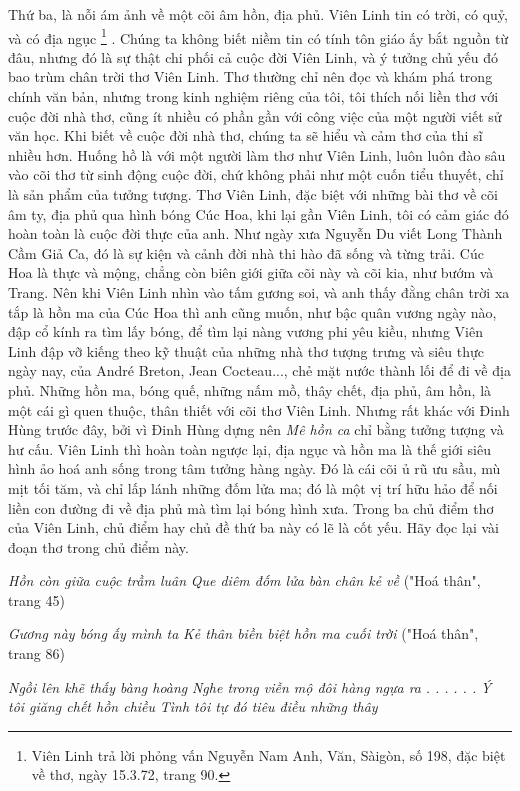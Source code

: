 \documentclass[../main.tex]{subfiles}
\begin{document}
\begin{multicols}{2}
Thứ ba, là nỗi ám ảnh về một cõi âm hồn, địa phủ. Viên Linh tin có trời, có quỷ, và có địa ngục \footnote{
Viên Linh trả lời phỏng vấn Nguyễn Nam Anh, Văn, Sàigòn, số 198, đặc biệt về thơ, ngày 15.3.72, trang 90.} . Chúng ta không biết niềm tin có tính tôn giáo ấy bắt nguồn từ đâu, nhưng đó là sự thật chi phối cả cuộc đời Viên Linh, và ý tưởng chủ yếu đó bao trùm chân trời thơ Viên Linh. Thơ thường chỉ nên đọc và khám phá trong chính văn bản, nhưng trong kinh nghiệm riêng của tôi, tôi thích nối liền thơ với cuộc đời nhà thơ, cũng ít nhiều có phần gần với công việc của một người viết sử văn học. Khi biết về cuộc đời nhà thơ, chúng ta sẽ hiểu và cảm thơ của thi sĩ nhiều hơn. Huống hồ là với một người làm thơ như Viên Linh, luôn luôn đào sâu vào cõi thơ từ sinh động cuộc đời, chứ không phải như một cuốn tiểu thuyết, chỉ là sản phẩm của tưởng tượng. Thơ Viên Linh, đặc biệt với những bài thơ về cõi âm ty, địa phủ qua hình bóng Cúc Hoa, khi lại gần Viên Linh, tôi có cảm giác đó hoàn toàn là cuộc đời thực của anh. Như ngày xưa Nguyễn Du viết Long Thành Cầm Giả Ca, đó là sự kiện và cảnh đời nhà thi hào đã sống và từng trải. Cúc Hoa là thực và mộng, chẳng còn biên giới giữa cõi này và cõi kia, như bướm và Trang. Nên khi Viên Linh nhìn vào tấm gương soi, và anh thấy đằng chân trời xa tắp là hồn ma của Cúc Hoa thì anh cũng muốn, như bậc quân vương ngày nào, đập cổ kính ra tìm lấy bóng, để tìm lại nàng vương phi yêu kiều, nhưng Viên Linh đập vỡ kiếng theo kỹ thuật của những nhà thơ tượng trưng và siêu thực ngày nay, của André Breton, Jean Cocteau..., chẻ mặt nước thành lối để đi về địa phủ. Những hồn ma, bóng quế, những nấm mồ, thây chết, địa phủ, âm hồn, là một cái gì quen thuộc, thân thiết với cõi thơ Viên Linh. Nhưng rất khác với Đinh Hùng trước đây, bởi vì Đinh Hùng dựng nên \textit{Mê hồn ca} chỉ bằng tưởng tượng và hư cấu. Viên Linh thì hoàn toàn ngược lại, địa ngục và hồn ma là thế giới siêu hình ảo hoá anh sống trong tâm tưởng hàng ngày. Đó là cái cõi ủ rũ ưu sầu, mù mịt tối tăm, và chỉ lấp lánh những đốm lửa ma; đó là một vị trí hữu hảo để nối liền con đường đi về địa phủ mà tìm lại bóng hình xưa. Trong ba chủ điểm thơ của Viên Linh, chủ điểm hay chủ đề thứ ba này có lẽ là cốt yếu. Hãy đọc lại vài đoạn thơ trong chủ điểm này. 
 
\textit{Hồn còn giữa cuộc trầm luân} 
\textit{Que diêm đốm lửa bàn chân kẻ về} 
("Hoá thân", trang 45) 
 
\textit{Gương này bóng ấy mình ta} 
\textit{Kẻ thân biền biệt hồn ma cuối trời} 
("Hoá thân", trang 86) 
 
\textit{Ngồi lên khẽ thấy bàng hoàng} 
\textit{Nghe trong viễn mộ đôi hàng ngựa ra} 
\textit{. . .} 
\textit{. . .} 
\textit{Ý tôi giăng chết hồn chiều} 
\textit{Tình tôi tự đó tiêu điều những thây} 
 

\end{multicols}
\end{document}
